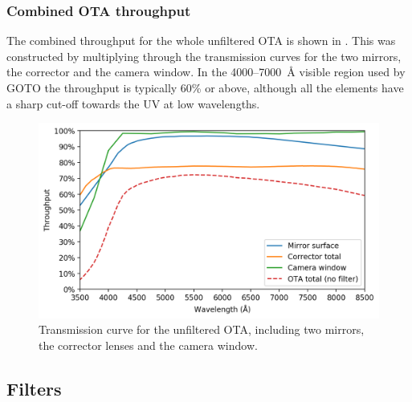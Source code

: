 \begin{colsection}
\begin{colsection}
\subsubsection{Combined OTA throughput}

The combined throughput for the whole unfiltered OTA is shown in . This was constructed by multiplying through the transmission curves for the two mirrors, the corrector and the camera window. In the 4000--\SI{7000}{\angstrom} visible region used by GOTO the throughput is typically 60\% or above, although all the elements have a sharp cut-off towards the UV at low wavelengths.

\begin{figure}[t]
    \begin{center}
        \includegraphics[width=\textwidth]{images/throughput/trans_ota.png}
    \end{center}
    \caption[Combined OTA transmission curve]{
        Transmission curve for the unfiltered OTA, including two mirrors, the corrector lenses and the camera window.
    }\label{fig:trans_ota}
\end{figure}

\end{colsection}

\newpage
\subsection{Filters}
\label{sec:filters}
\begin{colsection}


\end{colsection}
\end{colsection}
